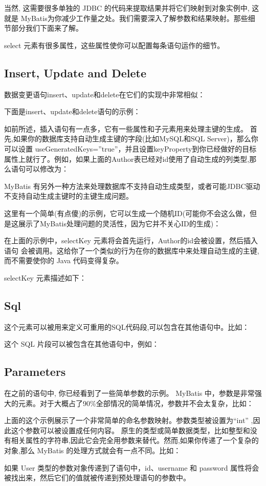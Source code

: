 

当然, 这需要很多单独的 JDBC 的代码来提取结果并将它们映射到对象实例中, 这就是 MyBatis为你减少工作量之处。我们需要深入了解参数和结果映射。那些细节部分我们下面来了解。

select 元素有很多属性，这些属性使你可以配置每条语句运作的细节。


\subsection{Insert, Update and Delete}
数据变更语句insert、update和delete在它们的实现中非常相似：



下面是insert、update和delete语句的示例：



如前所述，插入语句有一点多，它有一些属性和子元素用来处理主键的生成。
首先,如果你的数据库支持自动生成主键的字段(比如MySQL和SQL Server)，那么你可以设置 useGeneratedKeys=”true”，并且设置keyProperty到你已经做好的目标属性上就行了。例如，如果上面的Author表已经对id使用了自动生成的列类型,那么语句可以修改为：



MyBatis 有另外一种方法来处理数据库不支持自动生成类型，或者可能JDBC驱动不支持自动生成主键时的主键生成问题。

这里有一个简单(有点傻)的示例，它可以生成一个随机ID(可能你不会这么做，但是这展示了MyBatis处理问题的灵活性，因为它并不关心ID的生成)：




在上面的示例中，selectKey 元素将会首先运行，Author的id会被设置，然后插入语句 会被调用。这给你了一个类似的行为在你的数据库中来处理自动生成的主键, 而不需要使你的 Java 代码变得复杂。

selectKey 元素描述如下：



\subsection{Sql}
这个元素可以被用来定义可重用的SQL代码段,可以包含在其他语句中。比如：



这个 SQL 片段可以被包含在其他语句中，例如：


\subsection{Parameters}
在之前的语句中, 你已经看到了一些简单参数的示例。 MyBatis 中，参数是非常强大的元素。对于大概占了90\%全部情况的简单情况，参数并不会太复杂，比如：



上面的这个示例展示了一个非常简单的命名参数映射。参数类型被设置为“int” ,因此这个参数可以被设置成任何内容。 原生的类型或简单数据类型，比如整型和没有相关属性的字符串,因此它会完全用参数来替代。然而,如果你传递了一个复杂的对象,那么 MyBatis 的处理方式就会有一点不同。比如：



如果 User 类型的参数对象传递到了语句中，id、username 和 password 属性将会被找出来，然后它们的值就被传递到预处理语句的参数中。